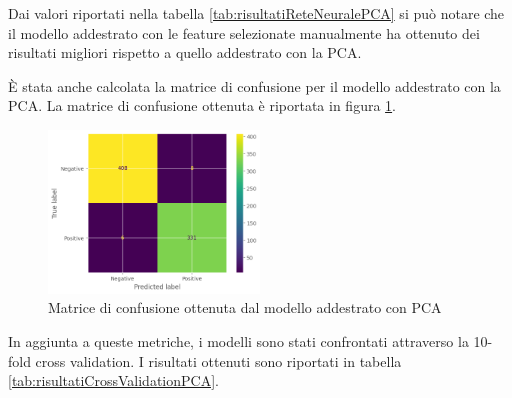 Dai valori riportati nella tabella \ref{tab:risultatiReteNeuralePCA} si può notare
che il modello addestrato con le feature selezionate manualmente ha ottenuto
dei risultati migliori rispetto a quello addestrato con la PCA.

È stata anche calcolata la matrice di confusione per il modello addestrato con
la PCA. La matrice di confusione ottenuta è riportata in figura \ref{fig:matriceConfusioneReteNeuralePCA}.

\begin{figure}[!ht]
    \centering
    \includegraphics[width=0.5\textwidth]{img/rete/matrice_confusione_pca.png}
    \caption{Matrice di confusione ottenuta dal modello addestrato con PCA}
    \label{fig:matriceConfusioneReteNeuralePCA}
\end{figure}

In aggiunta a queste metriche, i modelli sono stati confrontati attraverso la
10-fold cross validation. I risultati ottenuti sono riportati in tabella
\ref{tab:risultatiCrossValidationPCA}.

\begin{table}[ht]
    \centering
    \caption{Risultati ottenuti dalla cross validation}
    \label{tab:risultatiCrossValidationPCA}
\end{table}

